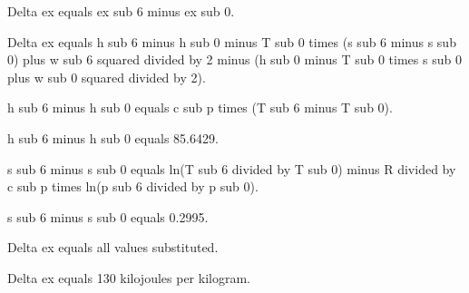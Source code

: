 Delta ex equals ex sub 6 minus ex sub 0.  

Delta ex equals h sub 6 minus h sub 0 minus T sub 0 times (s sub 6 minus s sub 0) plus w sub 6 squared divided by 2 minus (h sub 0 minus T sub 0 times s sub 0 plus w sub 0 squared divided by 2).  

h sub 6 minus h sub 0 equals c sub p times (T sub 6 minus T sub 0).  

h sub 6 minus h sub 0 equals 85.6429.  

s sub 6 minus s sub 0 equals ln(T sub 6 divided by T sub 0) minus R divided by c sub p times ln(p sub 6 divided by p sub 0).  

s sub 6 minus s sub 0 equals 0.2995.  

Delta ex equals all values substituted.  

Delta ex equals 130 kilojoules per kilogram.